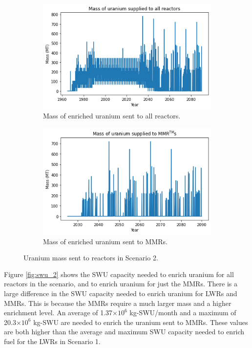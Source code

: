 \begin{figure}
    \centering
    \begin{subfigure}{0.5\textwidth}
        \centering
        \includegraphics[scale=0.5]{../figures/fuelsupply_scenarios_2.png}
        \caption{Mass of enriched uranium sent to all reactors.}
        \label{fig:totalfuel_2}
    \end{subfigure}
    \hspace{0.8cm}
    \begin{subfigure}{0.5\textwidth}
        \centering
        \includegraphics[scale=0.5]{../figures/advancedRX_fuelsupply_scenarios_2.png}
        \caption{Mass of enriched uranium sent to \glspl{MMR}.}
        \label{fig:haleu_2}
    \end{subfigure}
    \caption{Uranium mass sent to reactors in Scenario 2.}
    \label{fig:fuel_2}
\end{figure}

Figure \ref{fig:swu_2} shows the \gls{SWU} capacity needed to 
enrich uranium for all reactors in the scenario, and to enrich uranium for 
just the \glspl{MMR}. There is a large difference in the \gls{SWU} 
capacity needed to enrich uranium for \glspl{LWR} and \glspl{MMR}. This 
is because the \glspl{MMR} require a much larger mass and 
a higher enrichment level. An average of 1.37$\times 10^6$ kg-\gls{SWU}/month
and a maximum of 20.3$\times 10^6$ kg-\gls{SWU}
are needed to enrich the uranium sent to \glspl{MMR}. These values are both 
higher than the 
average and maximum \gls{SWU} capacity needed to enrich fuel for the 
\glspl{LWR} in Scenario 1. 


